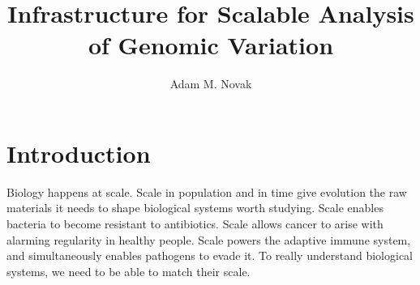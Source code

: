 \documentclass[11pt,proposal]{ucthesis}
\begin{document}

\title{Infrastructure for Scalable Analysis of Genomic Variation}
\author{Adam M. Novak}
\deanlinethree{}

\begin{frontmatter}

\maketitle
\copyrightpage

\tableofcontents
\listoffigures
\listoftables

\begin{abstract}

\end{abstract}

\begin{acknowledgements}

\end{acknowledgements}

\end{frontmatter}

\chapter{Introduction}

Biology happens at scale. Scale in population and in time give evolution the raw materials it needs to shape biological systems worth studying. Scale enables bacteria to become resistant to antibiotics. Scale allows cancer to arise with alarming regularity in healthy people. Scale powers the adaptive immune system, and simultaneously enables pathogens to evade it. To really understand biological systems, we need to be able to match their scale.
\end{document}
